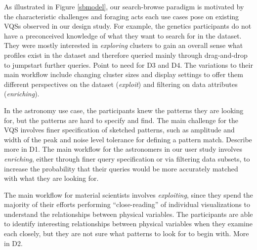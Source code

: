 \par As illustrated in Figure \ref{sbmodel}, our search-browse paradigm is motivated by the characteristic challenges and foraging acts each use cases pose on existing VQSs observed in our design study. For example, the genetics participants do not have a preconceived knowledge of what they want to search for in the dataset. They were mostly interested in \textit{exploring} clusters to gain an overall sense what profiles exist in the dataset  and therefore queried mainly through drag-and-drop to jumpstart further queries. Point to need for D3 and D4. The variations to their main workflow include changing cluster sizes and display settings to offer them different perspectives on the dataset (\textit{exploit}) and filtering on data attributes (\textit{enriching}).
\par In the astronomy use case, the participants knew the patterns they are looking for, but the patterns are hard to specify and find. The main challenge for the VQS involves finer specification of sketched patterns, such as amplitude and width of the peak and noise level tolerance for defining a pattern match. Describe more in D1. The main workflow for the astronomers in our user study involves \textit{enriching}, either through finer query specification or via filtering data subsets, to increase the probability that their queries would be more accurately matched with what they are looking for.
\par The main workflow for material scientists involves \textit{exploiting}, since they spend the majority of their efforts performing ``close-reading'' of individual visualizations to understand the relationships between physical variables. The participants are able to identify interesting relationships between physical variables when they examine each closely, but they are not sure what patterns to look for to begin with. More in D2.

